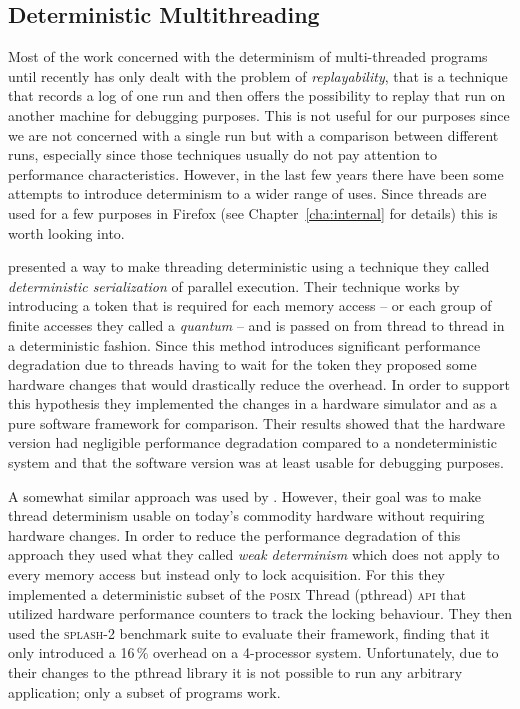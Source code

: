 \subsection{Deterministic Multithreading} %
\label{sec:bg:detmult}

Most of the work concerned with the determinism of multi-threaded programs
until recently has only dealt with the problem of \emph{replayability}, that
is a technique that records a log of one run and then offers the possibility
to replay that run on another machine for debugging purposes. This is not
useful for our purposes since we are not concerned with a single run but with
a comparison between different runs, especially since those techniques usually
do not pay attention to performance characteristics. However, in the last few
years there have been some attempts to introduce determinism to a wider range
of uses. Since threads are used for a few purposes in Firefox (see
Chapter~\ref{cha:internal} for details) this is worth looking into.

\citet{devietti_dmp:_2009} presented a way to make threading deterministic
using a technique they called \emph{deterministic serialization} of parallel
execution. Their technique works by introducing a token that is required for
each memory access -- or each group of finite accesses they called a
\emph{quantum} -- and is passed on from thread to thread in a deterministic
fashion. Since this method introduces significant performance degradation due
to threads having to wait for the token they proposed some hardware changes
that would drastically reduce the overhead. In order to support this
hypothesis they implemented the changes in a hardware simulator and as a pure
software framework for comparison. Their results showed that the hardware
version had negligible performance degradation compared to a nondeterministic
system and that the software version was at least usable for debugging
purposes.

A somewhat similar approach was used by \citet{olszewski_kendo:_2009}.
However, their goal was to make thread determinism usable on today's commodity
hardware without requiring hardware changes. In order to reduce the
performance degradation of this approach they used what they called \emph{weak
determinism} which does not apply to every memory access but instead only to
lock acquisition. For this they implemented a deterministic subset of the
\textsc{posix} Thread (pthread) \textsc{api} that utilized hardware
performance counters to track the locking behaviour. They then used the
\textsc{splash-2} benchmark suite to evaluate their framework, finding that it
only introduced a 16\,\% overhead on a 4-processor system. Unfortunately, due
to their changes to the pthread library it is not possible to run any
arbitrary application; only a subset of programs work.

